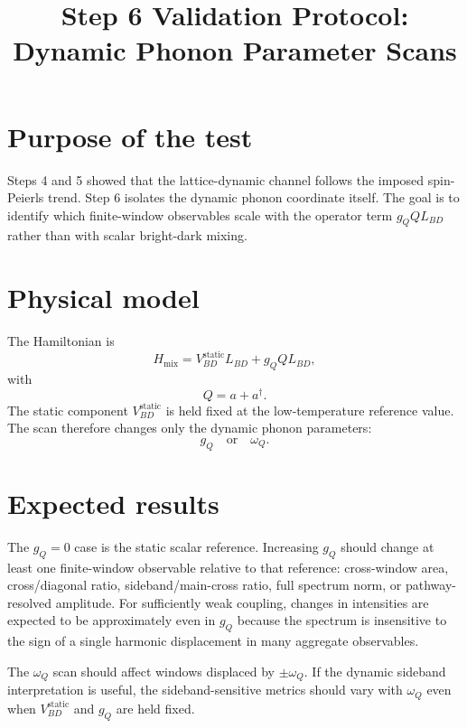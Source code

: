 \documentclass[11pt]{article}
\title{Step 6 Validation Protocol: Dynamic Phonon Parameter Scans}
\author{}
\date{}
\begin{document}
\maketitle

\section{Purpose of the test}
Steps 4 and 5 showed that the lattice-dynamic channel follows the imposed
spin-Peierls trend.  Step 6 isolates the dynamic phonon coordinate itself.  The
goal is to identify which finite-window observables scale with the operator
term $g_Q Q L_{BD}$ rather than with scalar bright-dark mixing.

\section{Physical model}
The Hamiltonian is
\begin{equation}
H_{\mathrm{mix}} =
V_{BD}^{\mathrm{static}} L_{BD}
+ g_Q Q L_{BD},
\end{equation}
with
\begin{equation}
Q=a+a^\dagger.
\end{equation}
The static component $V_{BD}^{\mathrm{static}}$ is held fixed at the
low-temperature reference value.  The scan therefore changes only the dynamic
phonon parameters:
\begin{equation}
g_Q \quad\mathrm{or}\quad \omega_Q.
\end{equation}

\section{Expected results}
The $g_Q=0$ case is the static scalar reference.  Increasing $g_Q$ should
change at least one finite-window observable relative to that reference:
cross-window area, cross/diagonal ratio, sideband/main-cross ratio, full
spectrum norm, or pathway-resolved amplitude.  For sufficiently weak coupling,
changes in intensities are expected to be approximately even in $g_Q$ because
the spectrum is insensitive to the sign of a single harmonic displacement in
many aggregate observables.

The $\omega_Q$ scan should affect windows displaced by $\pm\omega_Q$.  If the
dynamic sideband interpretation is useful, the sideband-sensitive metrics
should vary with $\omega_Q$ even when $V_{BD}^{\mathrm{static}}$ and $g_Q$ are
held fixed.
\end{document}
